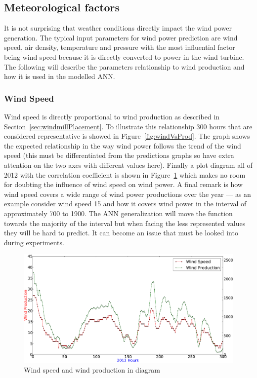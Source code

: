 \subsection{Meteorological factors}
It is not surprising that weather conditions directly impact the wind power generation. The typical input parameters for wind power prediction are wind speed, air density, temperature and pressure \cite{WindPowerGenerationUsingANN} with the most influential factor being wind speed because it is directly converted to power in the wind turbine. The following will describe the parameters relationship to wind production and how it is used in the modelled ANN.

\subsubsection{Wind Speed}
\label{sec:windPowerWindSpeed}
Wind speed is directly proportional to wind production as described in Section~\ref{sec:windmillPlacement}. To illustrate this relationship 300 hours that are considered representative is showed in Figure~\ref{fig:windVsProd}.  The graph shows the expected relationship in the way wind power follows the trend of the wind speed (this must be differentiated from the predictions graphs so have extra attention on the two axes with different values here). Finally a plot diagram all of 2012 with the correlation coefficient is shown in Figure~\ref{fig:windSpeedWindProductionPlot} which makes no room for doubting the influence of wind speed on wind power. A final remark is how wind speed covers a wide range of wind power productions over the year --- as an example consider wind speed 15 and how it covers wind power in the interval of approximately 700 to 1900. The ANN generalization will move the function towards the majority of the interval but when facing the less represented values they will be hard to predict. It can become an issue that must be looked into during experiments.  

\begin{figure}[H]
\centering
\includegraphics[width=0.99\linewidth]{billeder/windSpeedWindProductionPlot.png}
\caption{Wind speed and wind production in diagram}
\label{fig:windSpeedWindProductionPlot}
\end{figure}

